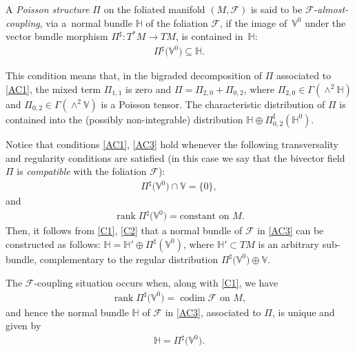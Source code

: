 \documentclass[pdftex]{sigma}
\numberwithin{equation}{section}
\begin{document}
\begin{Definition}
A \emph{Poisson structure} $\Pi$ on the foliated manifold $(M,\mathcal{F})$ is said to be $\mathcal{F}$-\emph{almost-coupling}, via a~normal bundle $\mathbb{H}$ of the foliation $\mathcal{F}$, if the image of~$\mathbb{V}^{0}$ under the vector bundle morphism $\Pi^{\sharp}\colon T^{\ast}M\rightarrow TM$, is contained in~$\mathbb{H}$:
\begin{gather}\label{AC3}
\Pi^{\sharp}\big(\mathbb{V}^{0}\big)\subseteq\mathbb{H}.
\end{gather}
\end{Definition}

This condition means that, in the bigraded decomposition of $\Pi$ associated to \eqref{AC1}, the mixed term $\Pi_{1,1}$ is zero and $\Pi=\Pi_{2,0}+\Pi_{0,2}$, where $\Pi_{2,0}\in\Gamma(\wedge^{2}\mathbb{H})$ and $\Pi_{0,2}\in\Gamma(\wedge^{2}\mathbb{V})$ is a Poisson tensor. The characteristic distribution of $\Pi$ is contained into the (possibly non-integrable) distribution $\mathbb{H}\oplus\Pi_{0,2}^{\sharp}(\mathbb{H}^{0})$.
\begin{Remark}
Notice that conditions \eqref{AC1}, \eqref{AC3} hold whenever the following transversality and regularity conditions are satisf\/ied (in this case we say that the bivector f\/ield $\Pi$ is \emph{compatible} with the foliation $\mathcal{F}$):
\begin{gather}\label{C1}
\Pi^{\sharp}\big(\mathbb{V}^{0}\big)\cap\mathbb{V}=\{0\} ,
\end{gather}
and
\begin{gather}\label{C2}
\operatorname{rank}\Pi^{\sharp}\big(\mathbb{V}^{0}\big)=\mbox{constant on }M.
\end{gather}
Then, it follows from \eqref{C1}, \eqref{C2} that a normal bundle of $\mathcal{F}$ in \eqref{AC3} can be constructed as follows: $\mathbb{H}=\mathbb{H}'\oplus\Pi^{\sharp}(\mathbb{V}^{0})$, where $\mathbb{H}'\subset TM$ is an arbitrary sub-bundle, complementary to the regular distribution $\Pi^{\sharp}\big(\mathbb{V}^{0}\big)\oplus\mathbb{V}$.
\end{Remark}
The $\mathcal{F}$-coupling situation occurs when, along with \eqref{C1}, we have
\begin{gather*}%
\operatorname{rank}\Pi^{\sharp}\big(\mathbb{V}^{0}\big)=\operatorname{codim}\mathcal{F}\mbox{ on }M,
\end{gather*}
and hence the normal bundle $\mathbb{H}$ of $\mathcal{F}$ in \eqref{AC3}, associated to $\Pi$, is unique and given by
\begin{gather}\label{CC2}
\mathbb{H}=\Pi^{\sharp}\big(\mathbb{V}^{0}\big).
\end{gather}
\end{document}

